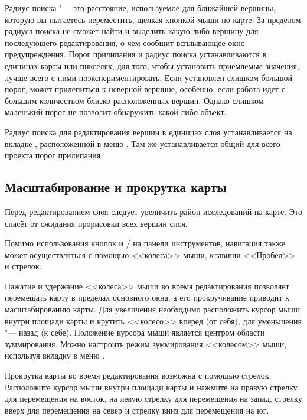 Радиус поиска "--- это расстояние, используемое \qg для 
ближайшей вершины, которую вы пытаетесь переместить, щелкая кнопкой мыши
по карте. За пределом радиуса поиска \qg не сможет найти и выделить
какую-либо вершину для последующего редактирования, о чем сообщит
всплывающее окно предупреждения. Порог прилипания и радиус поиска
устанавливаются в единицах карты или пикселях, для того, чтобы установить
приемлемые значения, лучше всего с ними поэкспериментировать. Если установлен
слишком большой порог, \qg может прилепиться к неверной вершине, особенно,
если работа идет с большим количеством близко расположенных вершин. Однако
слишком маленький порог не позволит обнаружить какой-либо объект.

Радиус поиска для редактирования вершин в единицах слоя устанавливается
на вкладке , расположенной в меню 
\arrow {}. Там же устанавливается
общий для всего проекта порог прилипания.

\subsection{Масштабирование и прокрутка карты}

Перед редактированием слоя следует увеличить район исследований на карте.
Это спасёт от ожидания прорисовки всех вершин слоя.

Помимо использования кнопок  и
/
на панели инструментов, навигация также может осуществляться с
помощью <<колеса>> мыши, клавиши <<Пробел>> и стрелок.


Нажатие и удержание <<колеса>> мыши во время редактирования позволяет перемещать
карту в пределах основного окна, а его прокручивание приводит к
масштабированию карты. Для увеличения необходимо расположить курсор мыши внутри
площади карты и крутить <<колесо>> вперед (от себя), для уменьшения "--- назад
(к себе). Положение курсора мыши является центром области зуммирования. Можно
настроить режим зуммирования <<колесом>> мыши, используя вкладку
 в меню  \arrow {}.


Прокрутка карты во время редактирования возможна с помощью стрелок. Расположите
курсор мыши внутри площади карты и нажмите на правую стрелку для перемещения на
восток, на левую стрелку для перемещения на запад, стрелку вверх для перемещения на
север и стрелку вниз для перемещения на юг.

